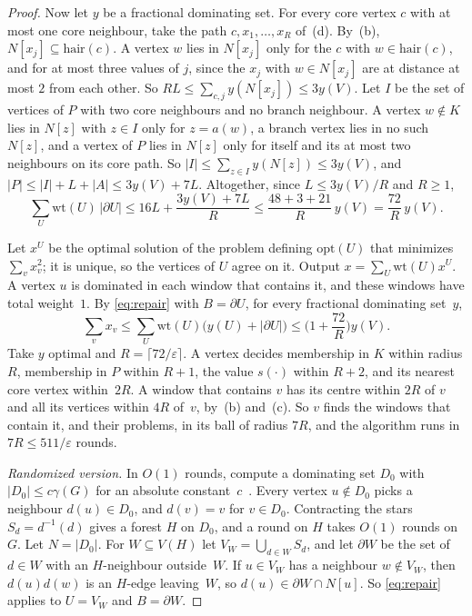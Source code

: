 \documentclass[11pt]{article}
\theoremstyle{remark}
\begin{document}
\begin{proof}
Now let $y$ be a fractional dominating set. For every core vertex $c$ with at most one core
neighbour, take the path $c,x_1,\dots,x_R$ of~(d). By~(b), $N[x_j]\subseteq\mathrm{hair}(c)$. A vertex
$w$ lies in $N[x_j]$ only for the $c$ with $w\in\mathrm{hair}(c)$, and for at most three values of $j$,
since the $x_j$ with $w\in N[x_j]$ are at distance at most $2$ from each other. So
$RL\le\sum_{c,j}y(N[x_j])\le3y(V)$. Let $I$ be the set of vertices of $P$ with two core neighbours and
no branch neighbour. A vertex $w\notin K$ lies in $N[z]$ with $z\in I$ only for $z=a(w)$, a branch
vertex lies in no such $N[z]$, and a vertex of $P$ lies in $N[z]$ only for itself and its at most two
neighbours on its core path. So $|I|\le\sum_{z\in I}y(N[z])\le3y(V)$, and
$|P|\le|I|+L+|A|\le3y(V)+7L$. Altogether, since $L\le3y(V)/R$ and $R\ge1$,
\[
  \sum_U\mathrm{wt}(U)\,|\partial U|\le16L+\frac{3y(V)+7L}{R}\le\frac{48+3+21}{R}\,y(V)
  =\frac{72}{R}\,y(V).
\]

Let $x^U$ be the optimal solution of the problem defining $\mathrm{opt}(U)$ that minimizes
$\sum_vx_v^2$; it is unique, so the vertices of $U$ agree on it. Output $x=\sum_U\mathrm{wt}(U)x^U$. A
vertex $u$ is dominated in each window that contains it, and these windows have total weight~$1$. By
\eqref{eq:repair} with $B=\partial U$, for every fractional dominating set~$y$,
\[
  \sum_vx_v\le\sum_U\mathrm{wt}(U)\big(y(U)+|\partial U|\big)\le\Big(1+\frac{72}{R}\Big)y(V).
\]
Take $y$ optimal and $R=\lceil72/\varepsilon\rceil$. A vertex decides membership in $K$ within radius
$R$, membership in $P$ within $R+1$, the value $s(\cdot)$ within $R+2$, and its nearest core vertex
within~$2R$. A window that contains $v$ has its centre within $2R$ of $v$ and all its vertices within
$4R$ of~$v$, by~(b) and~(c). So $v$ finds the windows that contain it, and their problems, in its ball
of radius $7R$, and the algorithm runs in $7R\le511/\varepsilon$ rounds.

\emph{Randomized version.} In $O(1)$ rounds, compute a dominating set $D_0$ with
$|D_0|\le c\gamma(G)$ for an absolute constant~$c$~\cite{LOW08}. Every vertex $u\notin D_0$ picks a
neighbour $d(u)\in D_0$, and $d(v)=v$ for $v\in D_0$. Contracting the stars $S_d=d^{-1}(d)$ gives a
forest $H$ on $D_0$, and a round on $H$ takes $O(1)$ rounds on~$G$. Let $N=|D_0|$. For
$W\subseteq V(H)$ let $V_W=\bigcup_{d\in W}S_d$, and let $\partial W$ be the set of $d\in W$ with an
$H$-neighbour outside~$W$. If $u\in V_W$ has a neighbour $w\notin V_W$, then $d(u)d(w)$ is an $H$-edge
leaving~$W$, so $d(u)\in\partial W\cap N[u]$. So \eqref{eq:repair} applies to $U=V_W$ and
$B=\partial W$.


\end{proof}
\end{document}
